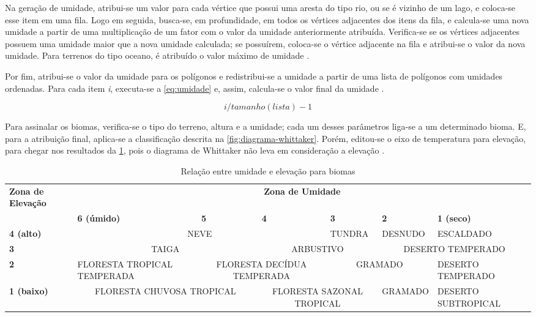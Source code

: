 Na geração de umidade, atribui-se um valor para cada vértice que possui uma aresta do tipo rio, ou se é vizinho de um lago, e coloca-se esse item em uma fila. Logo em seguida, busca-se, em profundidade, em todos os vértices adjacentes dos itens da fila, e calcula-se uma nova umidade a partir de uma multiplicação de um fator com o valor da umidade anteriormente atribuída. Verifica-se se os vértices adjacentes possuem uma umidade maior que a nova umidade calculada; se possuírem, coloca-se o vértice adjacente na fila e atribui-se o valor da nova umidade. Para terrenos do tipo oceano, é atribuído o valor máximo de umidade \cite{amitp2010}.

Por fim, atribui-se o valor da umidade para os polígonos e redistribui-se a umidade a partir de uma lista de polígonos com umidades ordenadas. Para cada item \textit{i}, executa-se a \cref{eq:umidade} e, assim, calcula-se o valor final da umidade \cite{amitp2010}.

\begin{equation}
\label{eq:umidade}
i / tamanho(lista) - 1
\end{equation}

Para assinalar os biomas, verifica-se o tipo do terreno, altura e a umidade; cada um desses parâmetros liga-se a um determinado bioma. E, para a atribuição final, aplica-se a classificação descrita na \cref{fig:diagrama-whittaker}. Porém, editou-se o eixo de temperatura para elevação, para chegar nos resultados da \cref{tab:biomes}, pois o diagrama de Whittaker não leva em consideração a elevação \cite{amitp2010}.

\begin{table}
	\centering
	\caption{Relação entre umidade e elevação para biomas}
	\label{tab:biomes}
	\begin{tabularx}{\textwidth}{|X|X|X|X|X|X|X|}
	\hline
	\textbf{Zona de Elevação} & \multicolumn{6}{c|}{\textbf{Zona de Umidade}} \\
	\cline{2-7}
	 & \textbf{6 (úmido)} & \textbf{5} & \textbf{4} & \textbf{3} & \textbf{2} & \textbf{1 (seco)} \\
	\hline
	\textbf{4 (alto)} & \multicolumn{3}{|c|}{NEVE} & TUNDRA & DESNUDO & ESCALDADO  \\
	\hline
	\textbf{3} & \multicolumn{2}{|c|}{TAIGA} & \multicolumn{2}{|c|}{ARBUSTIVO} & \multicolumn{2}{|c|}{DESERTO TEMPERADO} \\
	\hline
	\textbf{2} & FLORESTA TROPICAL TEMPERADA & \multicolumn{2}{|c|}{FLORESTA DECÍDUA TEMPERADA} & \multicolumn{2}{|c|}{GRAMADO} & DESERTO TEMPERADO  \\
	\hline
	\textbf{1 (baixo)} &  \multicolumn{2}{|c|}{FLORESTA CHUVOSA TROPICAL} & \multicolumn{2}{|c|}{FLORESTA SAZONAL TROPICAL} & GRAMADO & DESERTO SUBTROPICAL  \\
	\hline
	\end{tabularx}
\end{table}

